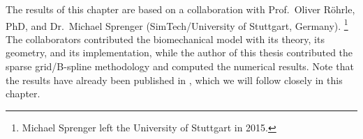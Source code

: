 The results of this chapter are based on a collaboration with
Prof.\ Oliver Röhrle, PhD, and Dr.\ Michael Sprenger
(SimTech/University of Stuttgart, Germany).%
\footnote{%
  Michael Sprenger left the University of Stuttgart in 2015.%
}
The collaborators contributed the biomechanical model
with its theory, its geometry, and its implementation,
while the author of this thesis contributed the
sparse grid/B-spline methodology and
computed the numerical results.
Note that the results have already been
published in \cite{Valentin18Gradient},
which we will follow closely in this chapter.





\cleardoublepage
